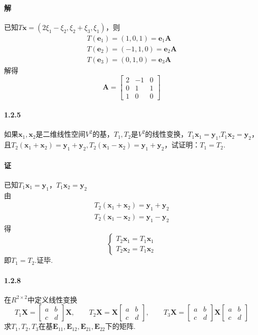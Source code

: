 \documentclass[12pt, a4paper, oneside, fontset=none]{ctexart}
\begin{document}
\paragraph*{解} 已知$T\bm{x} = (2\xi_1 - \xi_2, \xi_2 + \xi_3, \xi_1)$，则
\begin{gather*}
    T(\bm{e}_1) = (1, 0, 1) = \bm{e}_1 \bm{A} \\
    T(\bm{e}_2) = (-1, 1, 0) = \bm{e}_2 \bm{A} \\
    T(\bm{e}_3) = (0, 1, 0) = \bm{e}_3 \bm{A}
\end{gather*}
解得
\[
    \bm{A} = \begin{bmatrix}
        2 & -1 & 0 \\
        0 & 1  & 1 \\
        1 & 0  & 0
    \end{bmatrix}
\]

\paragraph*{1.2.5} 如果$\bm{x}_1,\bm{x}_2$是二维线性空间$V^2$的基，$T_1,T_2$是$V^2$的线性变换，$T_1\bm{x}_1 = \bm{y}_1$,$T_1\bm{x}_2 = \bm{y}_2$，
且$T_2(\bm{x}_1 + \bm{x}_2) = \bm{y}_1 + \bm{y}_2, T_2(\bm{x}_1 - \bm{x}_2) = \bm{y}_1 + \bm{y}_2$，试证明：$T_1 = T_2$.

\paragraph*{证} 已知$T_1\bm{x}_1 = \bm{y}_1$，$T_1\bm{x}_2 = \bm{y}_2$ \\
由
\begin{gather*}
    T_2(\bm{x}_1 + \bm{x}_2) = \bm{y}_1 + \bm{y}_2  \\
    T_2(\bm{x}_1 - \bm{x}_2) = \bm{y}_1 - \bm{y}_2
\end{gather*}
得
\[
    \begin{cases}
        T_2\bm{x}_1 = T_1\bm{x}_1 \\
        T_2\bm{x}_2 = T_1\bm{x}_2
    \end{cases}
\]
即$T_1 = T_2$.证毕.

\paragraph*{1.2.8} 在$R^{2\times 2}$中定义线性变换
\[
    T_1\bm{X} = \begin{bmatrix}
        a & b \\
        c & d
    \end{bmatrix} \bm{X}, \qquad T_2\bm{X} = \bm{X}\begin{bmatrix}
        a & b \\
        c & d
    \end{bmatrix}, \qquad T_3\bm{X} = \begin{bmatrix}
        a & b \\
        c & d
    \end{bmatrix} \bm{X} \begin{bmatrix}
        a & b \\
        c & d
    \end{bmatrix}
\]
求$T_1, T_2, T_3$在基$\bm{E}_{11}, \bm{E}_{12}, \bm{E}_{21}, \bm{E}_{22}$下的矩阵.
\end{document}

